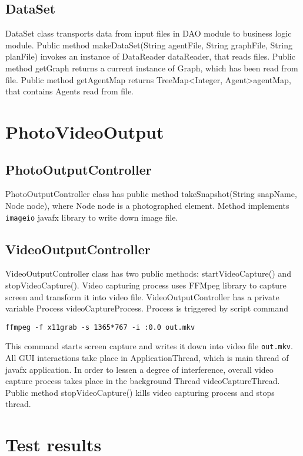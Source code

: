 \documentclass[thesis=B,english]{FITthesis}[2019/12/23]
\begin{document}
\subsection{DataSet}

DataSet class transports data from input files in DAO module to business logic module. Public method makeDataSet(String agentFile, String graphFile, String planFile) invokes an instance of DataReader dataReader, that reads files. Public method getGraph returns a current instance of Graph, which has been read from file. Public method getAgentMap returns TreeMap\textless Integer, Agent\textgreater agentMap, that contains Agents read from file.

\section{PhotoVideoOutput}

\subsection{PhotoOutputController}

PhotoOutputController class has public method takeSnapshot(String snapName, Node node), where Node node is a photographed element. Method implements \verb|imageio| javafx library to write down image file. 

\subsection{VideoOutputController}

VideoOutputController class has two public methods: startVideoCapture() and stopVideoCapture(). Video capturing process uses FFMpeg library to capture screen and transform it into video file. VideoOutputController has a private variable Process videoCaptureProcess. Process is triggered by script command

\verb|ffmpeg -f x11grab -s 1365*767 -i :0.0 out.mkv|

This command starts screen capture and writes it down into video file \verb|out.mkv|.
All GUI interactions take place in ApplicationThread, which is main thread of javafx application. In order to lessen a degree of interference, overall video capture process takes place in the background Thread videoCaptureThread. Public method stopVideoCapture() kills video capturing process and stops thread.

\section{Test results}
\end{document}

